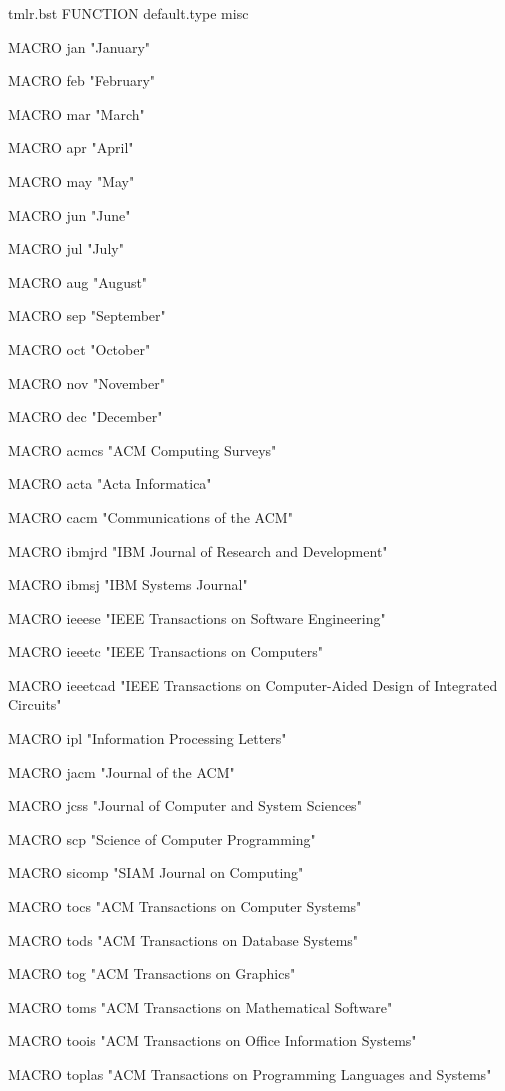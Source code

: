 \begin{filecontents*}[overwrite]{tmlr.bst}
FUNCTION {default.type} { misc }


MACRO {jan} {"January"}

MACRO {feb} {"February"}

MACRO {mar} {"March"}

MACRO {apr} {"April"}

MACRO {may} {"May"}

MACRO {jun} {"June"}

MACRO {jul} {"July"}

MACRO {aug} {"August"}

MACRO {sep} {"September"}

MACRO {oct} {"October"}

MACRO {nov} {"November"}

MACRO {dec} {"December"}



MACRO {acmcs} {"ACM Computing Surveys"}

MACRO {acta} {"Acta Informatica"}

MACRO {cacm} {"Communications of the ACM"}

MACRO {ibmjrd} {"IBM Journal of Research and Development"}

MACRO {ibmsj} {"IBM Systems Journal"}

MACRO {ieeese} {"IEEE Transactions on Software Engineering"}

MACRO {ieeetc} {"IEEE Transactions on Computers"}

MACRO {ieeetcad}
 {"IEEE Transactions on Computer-Aided Design of Integrated Circuits"}

MACRO {ipl} {"Information Processing Letters"}

MACRO {jacm} {"Journal of the ACM"}

MACRO {jcss} {"Journal of Computer and System Sciences"}

MACRO {scp} {"Science of Computer Programming"}

MACRO {sicomp} {"SIAM Journal on Computing"}

MACRO {tocs} {"ACM Transactions on Computer Systems"}

MACRO {tods} {"ACM Transactions on Database Systems"}

MACRO {tog} {"ACM Transactions on Graphics"}

MACRO {toms} {"ACM Transactions on Mathematical Software"}

MACRO {toois} {"ACM Transactions on Office Information Systems"}

MACRO {toplas} {"ACM Transactions on Programming Languages and Systems"}


\end{filecontents*}
